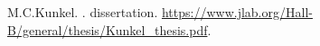 \documentclass[aps,prc,onecolumn,floatfix,showpacs,preprintnumbers,amsmath,amssymb,superscriptaddress]{revtex4-1}
\begin{document}
\begin{thebibliography}{99}
M.C.Kunkel.
.
 dissertation.
\newblock \url{https://www.jlab.org/Hall-B/general/thesis/Kunkel_thesis.pdf}.	
\end{thebibliography}
\end{document}
